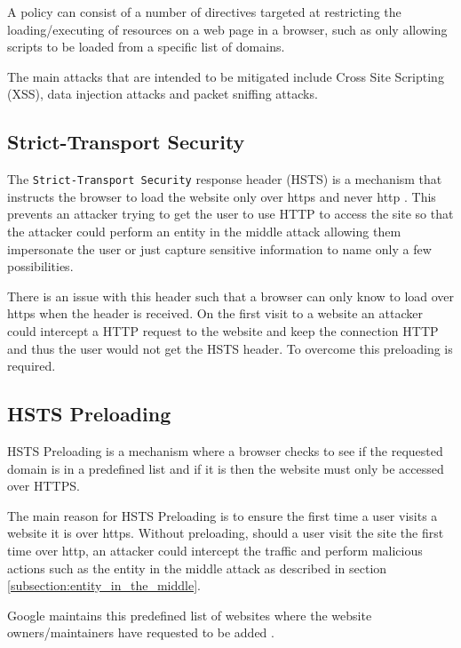 \documentclass{mscreport}
\begin{document}
\vspace{0.3cm} \noindent
A policy can consist of a number of directives targeted at restricting the loading/executing of resources on a web page in a browser, such as only allowing scripts to be loaded from a specific list of domains.

\vspace{0.3cm} \noindent
The main attacks that are intended to be mitigated include Cross Site Scripting (XSS), data injection attacks and packet sniffing attacks.


\subsection{Strict-Transport Security}
The \texttt{Strict-Transport Security} response header (HSTS) is a mechanism that instructs the browser to load the website only over https and never http \cite{Hodges2012-pe}. This prevents an attacker trying to get the user to use HTTP to access the site so that the attacker could perform an entity in the middle attack allowing them impersonate the user or just capture sensitive information to name only a few possibilities.

\vspace{0.3cm} \noindent
There is an issue with this header such that a browser can only know to load over https when the header is received. On the first visit to a website an attacker could intercept a HTTP request to the website and keep the connection HTTP and thus the user would not get the HSTS header. To overcome this preloading is required.


\subsection{HSTS Preloading}
HSTS Preloading is a mechanism where a browser checks to see if the requested domain is in a predefined list and if it is then the website must only be accessed over HTTPS.

\vspace{0.3cm} \noindent
The main reason for HSTS Preloading is to ensure the first time a user visits a website it is over https. Without preloading, should a user visit the site the first time over http, an attacker could intercept the traffic and perform malicious actions such as the entity in the middle attack as described in section \ref{subsection:entity_in_the_middle}.

\vspace{0.3cm} \noindent
Google maintains this predefined list of websites where the website owners/maintainers have requested to be added \cite{Hodges2012-pe}.
\end{document}
